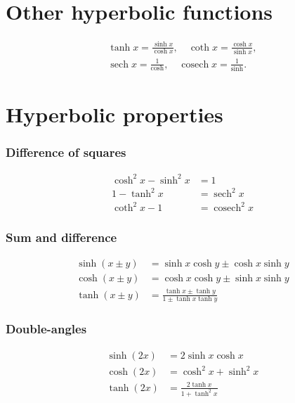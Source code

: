 \documentclass{report}
\DeclareMathOperator{\sech}{sech}
\DeclareMathOperator{\cosech}{cosech}
\begin{document}
	\section{Other hyperbolic functions}

	\begin{align*}
		\tanh x = \frac{\sinh x}{\cosh x}, \quad \coth x = \frac{\cosh x}{\sinh x},		\\
		\sech x = \frac{1}{\cosh}, \quad \cosech x = \frac{1}{\sinh}.
	\end{align*}

	\section{Hyperbolic properties}

	\subsubsection{Difference of squares}
		
		\begin{align*}
			\cosh^2 x - \sinh^2 x &= 1		\\
			1 - \tanh^2 x &= \sech^2 x		\\
			\coth^2 x - 1 &= \cosech^2 x
		\end{align*}

	\subsubsection{Sum and difference}

		\begin{align*}
			\sinh(x \pm y) &= \sinh x \cosh y \pm \cosh x \sinh y	\\
			\cosh(x \pm y) &= \cosh x \cosh y \pm \sinh x \sinh y	\\
			\tanh(x \pm y) &= \frac{\tanh x \pm \tanh y}{1 \pm \tanh x \tanh y}
		\end{align*}

	\subsubsection{Double-angles}

		\begin{align*}
			\sinh(2x) &= 2 \sinh x \cosh x	\\
			\cosh(2x) &= \cosh^2 x + \sinh^2 x	\\
			\tanh(2x) &= \frac{2 \tanh x}{1 + \tanh^2 x}
		\end{align*}
\end{document}
